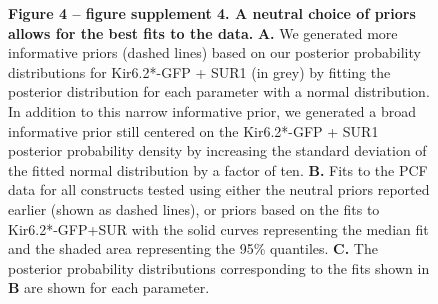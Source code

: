 \documentclass[10pt,lineno, doublespacing]{elife}
\begin{document}
\begin{figure}\ContinuedFloat
\begin{fullwidth}
\captionsetup{labelformat=empty}
\caption{
\textbf{Figure 4 -- figure supplement 4. A neutral choice of priors allows for the best fits to the data.}
\textbf{A.}
We generated more informative priors (dashed lines) based on our posterior probability distributions for Kir6.2*-GFP + SUR1 (in grey) by fitting the posterior distribution for each parameter with a normal distribution.
In addition to this narrow informative prior, we generated a broad informative prior still centered on the Kir6.2*-GFP + SUR1 posterior probability density by increasing the standard deviation of the fitted normal distribution by a factor of ten.
\textbf{B.}
Fits to the PCF data for all constructs tested using either the neutral priors reported earlier (shown as dashed lines), or priors based on the fits to Kir6.2*-GFP+SUR with the solid curves representing the median fit and the shaded area representing the 95\% quantiles.
\textbf{C.}
The posterior probability distributions corresponding to the fits shown in \textbf{B} are shown for each parameter.
}
\end{fullwidth}
\end{figure}
\end{document}
